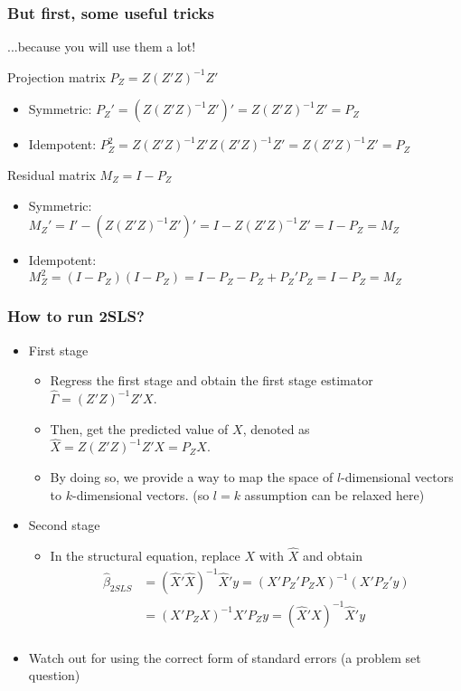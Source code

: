 \documentclass[aspectratio=169]{beamer}
\begin{document}
\begin{frame}
\frametitle{But first, some useful tricks}
...because you will use them a lot!
\begin{block}{Projection matrix $P_Z=Z(Z'Z)^{-1}Z'$}
\begin{itemize} 
\item Symmetric: $P_Z'=(Z(Z'Z)^{-1}Z')'=Z(Z'Z)^{-1}Z'=P_Z$
\item Idempotent: $P_Z^2=Z(Z'Z)^{-1}Z'Z(Z'Z)^{-1}Z'=Z(Z'Z)^{-1}Z'=P_Z$
\end{itemize}
\end{block}
\begin{block}{Residual matrix $M_Z=I-P_Z$}
\begin{itemize} 
\item Symmetric: $M_Z'=I'-(Z(Z'Z)^{-1}Z')'=I-Z(Z'Z)^{-1}Z'=I-P_Z=M_Z$
\item Idempotent: $M_Z^2=(I-P_Z)(I-P_Z)=I-P_Z-P_Z+P_Z'P_Z=I-P_Z=M_Z$
\end{itemize}
\end{block}
\end{frame}

\begin{frame}
\frametitle{How to run 2SLS?}
\begin{itemize}
\item First stage
\begin{itemize}
\item Regress the first stage and obtain the first stage estimator $\widehat{\Gamma}=(Z'Z)^{-1}Z'X$. 
\item Then, get the predicted value of $X$, denoted as $\widehat{X}=Z(Z'Z)^{-1}Z'X=P_ZX$. 
\item By doing so, we provide a way to map the space of $l$-dimensional vectors to $k$-dimensional vectors. (so $l=k$ assumption can be relaxed here)
\end{itemize}

\item Second stage
\begin{itemize}
\item In the structural equation, replace $X$ with $\widehat{X}$ and obtain
\[
\begin{aligned}
\hat{\beta}_{2SLS}&=(\widehat{X}'\widehat{X})^{-1}\widehat{X}'y=(X'P_Z'P_ZX)^{-1}(X'P_Z'y)\\
&=(X'P_ZX)^{-1}X'P_Zy =(\widehat{X}'X)^{-1}\widehat{X}'y\\
\end{aligned}
\]
\end{itemize}
\item Watch out for using the correct form of standard errors (a problem set question)
\end{itemize}
\end{frame}
\end{document}

